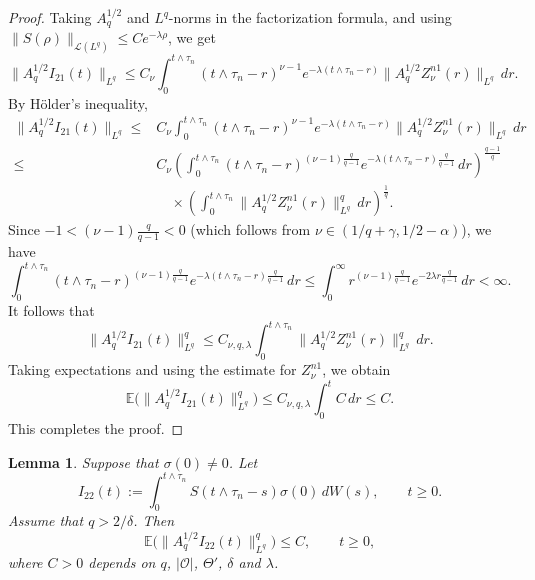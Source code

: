 \documentclass[10pt]{article}
\numberwithin{figure}{section}
\numberwithin{equation}{section}
\newtheorem{lemma}[theorem]{Lemma}
\newcommand{\0}{{\theta}}
\begin{document}
\begin{proof}
Taking $A_q^{1/2}$ and $L^q$-norms in the factorization formula, and using $\|S(\rho)\|_{\mathcal L(L^q)}\le C e^{-\lambda\rho}$, we get
$$
\|A_q^{1/2}I_{21}(t)\|_{L^q}
\le C_\nu
\int_0^{t\wedge\tau_n}(t\wedge\tau_n-r)^{\nu-1}
e^{-\lambda(t\wedge\tau_n-r)}
\|A_q^{1/2}Z_\nu^{n1}(r)\|_{L^q}\,dr.
$$
By H\"older's inequality,
$$\begin{aligned}\|A_q^{1/2}I_{21}(t)\|_{L^q} \le& C_\nu \int_0^{t \wedge \tau_n} (t \wedge \tau_n - r)^{\nu-1} e^{-\lambda(t \wedge \tau_n-r)} \|A_q^{1/2}Z_{\nu}^{n1}(r)\|_{L^q} \, dr\\
\le& C_\nu
\left( \int_0^{t \wedge \tau_n} (t \wedge \tau_n - r)^{(\nu-1)\frac{q}{q-1}} e^{-\lambda(t \wedge \tau_n-r)\frac{q}{q-1}} \, dr \right)^{\frac{q-1}{q}} \\
&\quad\times
\left( \int_0^{t \wedge \tau_n} \|A_q^{1/2}Z_{\nu}^{n1}(r)\|_{L^q}^q \, dr \right)^{\frac{1}{q}}.
\end{aligned}$$
Since $-1<(\nu-1)\frac{q}{q-1}<0$ (which follows from $\nu\in(1/q+\gamma,1/2-\alpha)$), we have $$\int_0^{t \wedge \tau_n} (t \wedge \tau_n - r)^{(\nu-1)\frac{q}{q-1}} e^{-\lambda(t \wedge \tau_n-r)\frac{q}{q-1}} \, dr\le \int_0^\infty r^{(\nu-1)\frac{q}{q-1}}e^{-2\lambda r\frac{q}{q-1}}\,dr < \infty.$$
It follows that $$
\|A_q^{1/2}I_{21}(t)\|_{L^q}^q
\le C_{\nu,q,\lambda}
\int_0^{t\wedge\tau_n}\|A_q^{1/2}Z_\nu^{n1}(r)\|_{L^q}^q\,dr.
$$
Taking expectations and using the estimate for $Z_\nu^{n1}$, we obtain
$$
\mathbb{E}\big(\|A_q^{1/2}I_{21}(t)\|_{L^q}^q\big)
\le C_{\nu,q,\lambda}\int_0^t C\,dr \le C.
$$
This completes the proof.
\end{proof}

\begin{lemma}\label{le2.8}
Suppose that $\sigma(0)\neq0$. Let
$$
I_{22}(t):=\int_0^{t\wedge\tau_n}S(t\wedge\tau_n-s)\sigma(0)\,dW(s),\qquad t\ge0.
$$
Assume that $q>2/\delta$. Then
$$
\mathbb{E}\big(\|A_q^{1/2}I_{22}(t)\|_{L^q}^q\big) \le C,\qquad t\ge0,
$$
where $C>0$ depends on $q$, $|\mathcal O|$, $\Theta'$, $\delta$ and $\lambda$.
\end{lemma}
\end{document}

